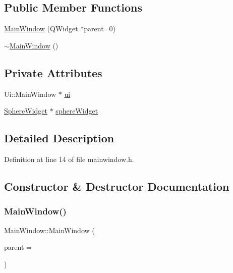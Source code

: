 \subsection*{Public Member Functions}
\begin{DoxyCompactItemize}
\item 
\hyperlink{class_main_window_a8b244be8b7b7db1b08de2a2acb9409db}{Main\+Window} (Q\+Widget $\ast$parent=0)
\item 
\hyperlink{class_main_window_ae98d00a93bc118200eeef9f9bba1dba7}{$\sim$\+Main\+Window} ()
\end{DoxyCompactItemize}
\subsection*{Private Attributes}
\begin{DoxyCompactItemize}
\item 
Ui\+::\+Main\+Window $\ast$ \hyperlink{class_main_window_a35466a70ed47252a0191168126a352a5}{ui}
\item 
\hyperlink{class_sphere_widget}{Sphere\+Widget} $\ast$ \hyperlink{class_main_window_afc60f18ae3cf60a9c231d8344a5bbda8}{sphere\+Widget}
\end{DoxyCompactItemize}


\subsection{Detailed Description}


Definition at line 14 of file mainwindow.\+h.



\subsection{Constructor \& Destructor Documentation}
\mbox{\label{class_main_window_a8b244be8b7b7db1b08de2a2acb9409db}} 
\subsubsection{\texorpdfstring{Main\+Window()}{MainWindow()}}
{\footnotesize\ttfamily Main\+Window\+::\+Main\+Window (\begin{DoxyParamCaption}\item[{Q\+Widget $\ast$}]{parent = {} }\end{DoxyParamCaption})\hspace{0.3cm}{\ttfamily [explicit]}}



